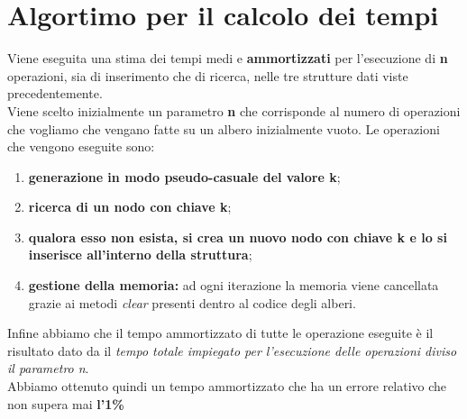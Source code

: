 \documentclass[a4paper]{article}
\begin{document}
		\section{Algortimo per il calcolo dei tempi}
		Viene eseguita una stima dei tempi medi e \textbf{ammortizzati} per l'esecuzione di \textbf{n} operazioni, sia di inserimento che di ricerca, nelle tre strutture dati viste precedentemente. \\
		Viene scelto inizialmente un parametro \textbf{n} che corrisponde al numero di operazioni che vogliamo che vengano fatte su un albero inizialmente vuoto. Le operazioni che vengono eseguite sono:
		\begin{enumerate}
			\item \textbf{generazione in modo pseudo-casuale del valore k};
			\item \textbf{ricerca di un nodo con chiave k};
			\item \textbf{qualora esso non esista, si crea un nuovo nodo con chiave k e lo si inserisce all'interno della struttura};
			\item \textbf{gestione della memoria:} ad ogni iterazione la memoria viene cancellata grazie ai metodi \textit{clear} presenti dentro al codice degli alberi.
		\end{enumerate}
		Infine abbiamo che il tempo ammortizzato di tutte le operazione eseguite è il risultato dato da il \textit{tempo totale impiegato per l'esecuzione delle operazioni diviso il parametro n}.\\
		Abbiamo ottenuto quindi un tempo ammortizzato che ha un errore relativo che non supera mai 
		\textbf{l'1\%}
		
\end{document}

